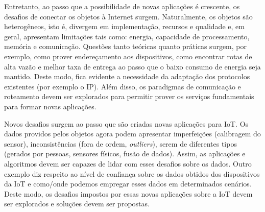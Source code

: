 \documentclass{SBCbookchapter}
\begin{document}
Entretanto, ao passo que a possibilidade de novas aplicações é crescente, os 
desafios de conectar os objetos à Internet surgem. Naturalmente, os objetos são
heterogêneos, isto é, divergem em implementação, recursos e qualidade e, em 
geral, apresentam limitações tais como: energia, capacidade de processamento, 
memória e comunicação. Questões tanto teóricas quanto práticas surgem, por 
exemplo, como prover endereçamento aos dispositivos, como encontrar rotas de 
alta vazão e melhor taxa de entrega ao passo que o baixo consumo de energia seja 
mantido. Deste modo, fica evidente a necessidade da adaptação dos protocolos 
existentes (por exemplo o IP). Além disso, os paradigmas de comunicação e 
roteamento devem ser explorados para permitir prover os serviços fundamentais 
para formar novas aplicações. 

Novos desafios surgem ao passo que são criadas novas aplicações para IoT. Os 
dados providos pelos objetos agora podem apresentar imperfeições (calibragem do 
sensor), inconsistências (fora de ordem, \textit{outliers}), serem de diferentes 
tipos (gerados por pessoas, sensores físicos, fusão de dados). Assim, as 
aplicações e algoritmos devem ser capazes de lidar com esses desafios sobre os 
dados. Outro exemplo diz respeito ao nível de confiança sobre os dados obtidos 
dos dispositivos da IoT e como/onde  podemos empregar esses dados em 
determinados cenários. Deste modo, os desafios impostos por essas novas 
aplicações sobre a IoT devem ser explorados e soluções devem ser propostas.

\end{document}
